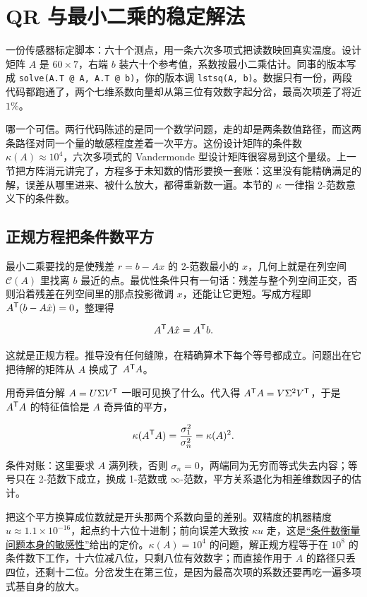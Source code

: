 \section{QR 与最小二乘的稳定解法}
\label{sec:08-Numerical-Analysis/05-Numerical-Linear-Algebra/02}

一份传感器标定脚本：六十个测点，用一条六次多项式把读数映回真实温度。设计矩阵 \(A\) 是 \(60\times7\)，右端 \(b\) 装六十个参考值，系数按最小二乘估计。同事的版本写成 \texttt{solve(A.T @ A, A.T @ b)}，你的版本调 \texttt{lstsq(A, b)}。数据只有一份，两段代码都跑通了，两个七维系数向量却从第三位有效数字起分岔，最高次项差了将近 \(1\%\)。

哪一个可信。两行代码陈述的是同一个数学问题，走的却是两条数值路径，而这两条路径对同一个量的敏感程度差着一次平方。这份设计矩阵的条件数 \(\kappa(A)\approx10^4\)，六次多项式的 Vandermonde 型设计矩阵很容易到这个量级。上一节把方阵消元讲完了，方程多于未知数的情形要换一套账：这里没有能精确满足的解，误差从哪里进来、被什么放大，都得重新数一遍。本节的 \(\kappa\) 一律指 2-范数意义下的条件数。

\subsection{正规方程把条件数平方}

最小二乘要找的是使残差 \(r=b-Ax\) 的 2-范数最小的 \(x\)，几何上就是在列空间 \(\mathcal C(A)\) 里找离 \(b\) 最近的点。最优性条件只有一句话：残差与整个列空间正交，否则沿着残差在列空间里的那点投影微调 \(x\)，还能让它更短。写成方程即 \(A^{\mathsf{T}}(b-A\hat x)=0\)，整理得

\[
A^{\mathsf{T}}A\hat x=A^{\mathsf{T}}b .
\]

这就是正规方程。推导没有任何缝隙，在精确算术下每个等号都成立。问题出在它把待解的矩阵从 \(A\) 换成了 \(A^{\mathsf{T}}A\)。

用奇异值分解 \(A=U\Sigma V^{\mathsf{T}}\) 一眼可见换了什么。代入得 \(A^{\mathsf{T}}A=V\Sigma^{2}V^{\mathsf{T}}\)，于是 \(A^{\mathsf{T}}A\) 的特征值恰是 \(A\) 奇异值的平方，

\[
\kappa(A^{\mathsf{T}}A)=\frac{\sigma_1^2}{\sigma_n^2}=\kappa(A)^2 .
\]

条件对账：这里要求 \(A\) 满列秩，否则 \(\sigma_n=0\)，两端同为无穷而等式失去内容；等号只在 2-范数下成立，换成 1-范数或 \(\infty\)-范数，平方关系退化为相差维数因子的估计。

把这个平方换算成位数就是开头那两个系数向量的差别。双精度的机器精度 \(u\approx1.1\times10^{-16}\)，起点约十六位十进制；前向误差大致按 \(\kappa u\) 走，这是\hyperref[sec:08-Numerical-Analysis/01-Floating-Point-and-Error/03]{``条件数衡量问题本身的敏感性''}给出的定价。\(\kappa(A)=10^4\) 的问题，解正规方程等于在 \(10^8\) 的条件数下工作，十六位减八位，只剩八位有效数字；而直接作用于 \(A\) 的路径只丢四位，还剩十二位。分岔发生在第三位，是因为最高次项的系数还要再吃一遍多项式基自身的放大。

